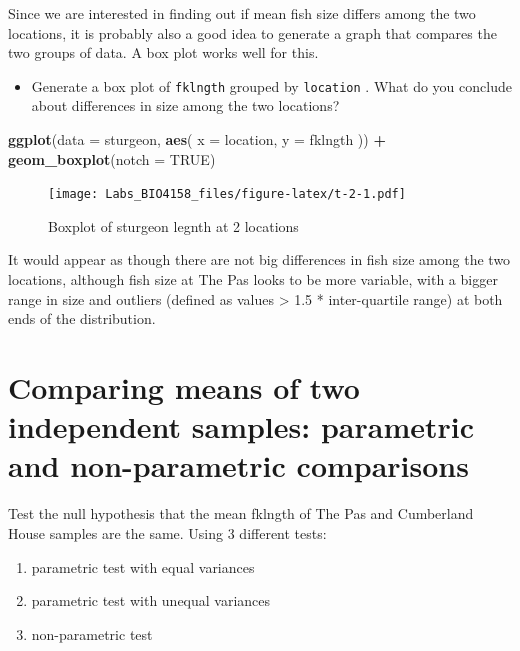 \documentclass[
  12pt,
]{book}
\newenvironment{Shaded}{\begin{snugshade}}{\end{snugshade}}
\newcommand{\DataTypeTok}[1]{\textcolor[rgb]{0.13,0.29,0.53}{#1}}
\newcommand{\KeywordTok}[1]{\textcolor[rgb]{0.13,0.29,0.53}{\textbf{#1}}}
\newcommand{\NormalTok}[1]{#1}
\newcommand{\OperatorTok}[1]{\textcolor[rgb]{0.81,0.36,0.00}{\textbf{#1}}}
\newcommand{\OtherTok}[1]{\textcolor[rgb]{0.56,0.35,0.01}{#1}}
\newcommand{\StringTok}[1]{\textcolor[rgb]{0.31,0.60,0.02}{#1}}
\providecommand{\tightlist}{%
  \setlength{\itemsep}{0pt}\setlength{\parskip}{0pt}}
\begin{document}
Since we are interested in finding out if mean fish size differs among the two locations, it is probably also a good idea to generate a graph that compares the two groups of data. A box plot works well for this.

\begin{itemize}
\tightlist
\item
  Generate a box plot of \texttt{fklngth} grouped by \texttt{location} . What do you conclude about differences in size among the two locations?
\end{itemize}

\begin{Shaded}
\begin{Highlighting}[]
\KeywordTok{ggplot}\NormalTok{(}\DataTypeTok{data =}\NormalTok{ sturgeon, }\KeywordTok{aes}\NormalTok{(}
  \DataTypeTok{x =}\NormalTok{ location,}
  \DataTypeTok{y =}\NormalTok{ fklngth}
\NormalTok{)) }\OperatorTok{+}
\StringTok{  }\KeywordTok{geom\_boxplot}\NormalTok{(}\DataTypeTok{notch =} \OtherTok{TRUE}\NormalTok{)}
\end{Highlighting}
\end{Shaded}

\begin{figure}
\centering
\texttt{[image: Labs\_BIO4158\_files/figure-latex/t-2-1.pdf]}
\caption{\label{fig:t-2}Boxplot of sturgeon legnth at 2 locations}
\end{figure}

It would appear as though there are not big differences in fish size among the two locations, although fish size at The Pas looks to be more variable, with a bigger range in size and outliers (defined as values \textgreater{} 1.5 * inter-quartile range) at both ends of the distribution.

\hypertarget{comparing-means-of-two-independent-samples-parametric-and-non-parametric-comparisons}{%
\section{Comparing means of two independent samples: parametric and non-parametric comparisons}\label{comparing-means-of-two-independent-samples-parametric-and-non-parametric-comparisons}}

Test the null hypothesis that the mean fklngth of The Pas and Cumberland House samples are the same. Using 3 different tests:

\begin{enumerate}
\def\labelenumi{\arabic{enumi}.}
\tightlist
\item
  parametric test with equal variances
\item
  parametric test with unequal variances
\item
  non-parametric test
\end{enumerate}
\end{document}
